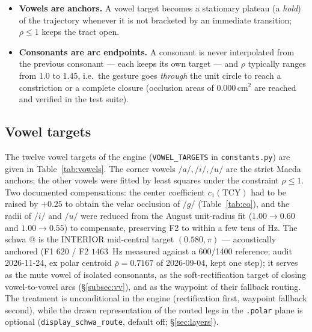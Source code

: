 \documentclass[11pt,a4paper]{article}
\begin{document}
\begin{itemize}[leftmargin=1.5em]
\item \textbf{Vowels are anchors.} A vowel target becomes a stationary
      plateau (a \emph{hold}) of the trajectory whenever it is not
      bracketed by an immediate transition; \(\rho \le 1\) keeps the tract
      open.
\item \textbf{Consonants are arc endpoints.} A consonant is never
      interpolated from the previous consonant --- each keeps its own
      target --- and \(\rho\) typically ranges from 1.0 to 1.45, i.e.\ the
      gesture goes \emph{through} the unit circle to reach a constriction
      or a complete closure (occlusion areas of \(0.000\,\mathrm{cm^2}\)
      are reached and verified in the test suite).
\end{itemize}

\subsection{Vowel targets}\label{subsec:vowels}

The twelve vowel targets of the engine
(\texttt{VOWEL\_TARGETS} in \texttt{constants.py}) are given in
Table~\ref{tab:vowels}. The corner vowels \(/a/, /i/, /u/\) are the
strict Maeda anchors; the other vowels were fitted by least squares under
the constraint \(\rho \le 1\). Two documented compensations: the
center coefficient \(c_1(\mathrm{TCY})\) had to be raised by \(+0.25\) to
obtain the velar occlusion of \(/g/\) (Table~\ref{tab:co}), and the radii
of \(/i/\) and \(/u/\) were reduced from the August
unit-radius fit (\(1.00 \to 0.60\) and \(1.00 \to 0.55\)) to compensate, preserving F2 to within a few tens of
Hz. The schwa \(@\) is the INTERIOR mid-central target
\((0.580, \pi)\) --- acoustically anchored (F1 \(620\) / F2 \(1463\)~Hz
measured against a 600/1400 reference; audit 2026-11-24, ex polar
centroid \(\bar\rho = 0.7167\) of 2026-09-04, kept one step); it serves
as the mute vowel of isolated consonants, as the soft-rectification
target of closing vowel-to-vowel arcs (\S\ref{subsec:vv}), and as the
waypoint of their fallback routing. The treatment is unconditional in
the engine (rectification first, waypoint fallback second), while the
drawn representation of the routed legs in the \texttt{.polar} plane is
optional (\texttt{display\_schwa\_route}, default off;
\S\ref{sec:layers}).
\end{document}
